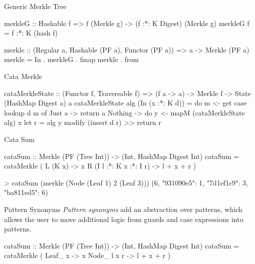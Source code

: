 \begin{slide}{Generic Merkle Tree}
\begin{haskell}
merkleG :: Hashable f => f (Merkle g) -> (f :*: K Digest) (Merkle g)
merkleG f = f :*: K (hash f)

merkle :: (Regular a, Hashable (PF a), Functor (PF a))
       => a -> Merkle (PF a)
merkle = In . merkleG . fmap merkle . from
\end{haskell}
\end{slide}

\begin{slide}{Cata Merkle}
\begin{haskell}
cataMerkleState :: (Functor f, Traversable f)
                => (f a -> a) -> Merkle f -> State (HashMap Digest a) a
cataMerkleState alg (In (x :*: K d)) 
  = do m <- get
       case lookup d m of
         Just a  -> return a
         Nothing -> do y <- mapM (cataMerkleState alg) x
                       let r = alg y
                       modify (insert d r) >> return r
\end{haskell}
\end{slide}

\begin{slide}{Cata Sum}
\begin{haskell}
cataSum :: Merkle (PF (Tree Int)) -> (Int, HashMap Digest Int)
cataSum = cataMerkle
  (\case
    L (K x)                 -> x
    R (I l :*: K x :*: I r) -> l + x + r
  )

> cataSum (merkle (Node (Leaf 1) 2 (Leaf 3)))
    (6, {"931090e5": 1, "7d1ef1c9": 3, "ba811ed5": 6})
\end{haskell}
\end{slide}

\begin{slide}{Pattern Synonyms}
\textit{Pattern synonyms} add an abstraction over patterns, which allows the user to move additional logic from guards and case expressions into patterns.

\vspace*{0.4cm}
\begin{haskell}
cataSum :: Merkle (PF (Tree Int)) -> (Int, HashMap Digest Int)
cataSum = cataMerkle
  (\case
    Leaf_ x     -> x
    Node_ l x r -> l + x + r
  )
\end{haskell}
\end{slide}